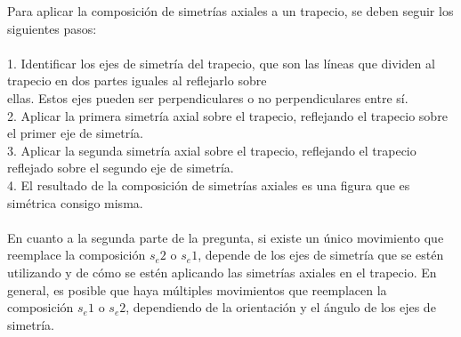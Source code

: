 \documentclass{article}
\begin{document}
Para aplicar la composición de simetrías axiales a un trapecio, se deben seguir los siguientes pasos:\\
\\
1. Identificar los ejes de simetría del trapecio, que son las líneas que dividen al trapecio en dos partes iguales al reflejarlo sobre\\
ellas. Estos ejes pueden ser perpendiculares o no perpendiculares entre sí.\\
2. Aplicar la primera simetría axial sobre el trapecio, reflejando el trapecio sobre el primer eje de simetría.\\
3. Aplicar la segunda simetría axial sobre el trapecio, reflejando el trapecio reflejado sobre el segundo eje de simetría.\\
4. El resultado de la composición de simetrías axiales es una figura que es simétrica consigo misma.\\
\\
En cuanto a la segunda parte de la pregunta, si existe un único movimiento que reemplace la composición $s_e2$ o $s_e1$, depende de los ejes de simetría que se estén utilizando y de cómo se estén aplicando las simetrías axiales en el trapecio. En general, es posible que haya múltiples movimientos que reemplacen la composición $s_e1$ o $s_e2$, dependiendo de la orientación y el ángulo de los ejes de simetría.\\
\\
\end{document}
